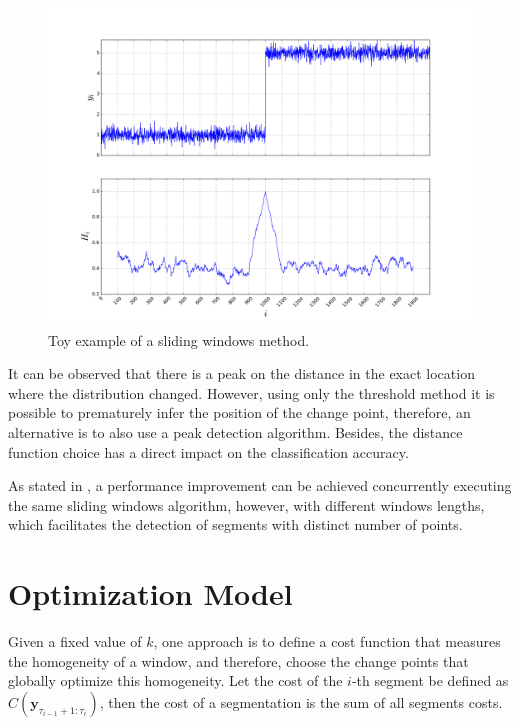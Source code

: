 \begin{figure}[H]
    \centering
    \includegraphics[width=1.0\textwidth]{./figures/sliding_window_toy_example.png}
    \caption{Toy example of a sliding windows method.}
    \label{fig:sliding_window_toy_example}
\end{figure}

It can be observed that there is a peak on the distance in the exact location where the distribution changed. However, using only the threshold method it is possible to prematurely infer the position of the change point, therefore, an alternative is to also use a peak detection algorithm. Besides, the distance function choice has a direct impact on the classification accuracy.

As stated in \cite{detecting_change_in_data_streams}, a performance improvement can be achieved concurrently executing the same sliding windows algorithm, however, with different windows lengths, which facilitates the detection of segments with distinct number of points.

\section{Optimization Model}  

Given a fixed value of $k$, one approach is to define a cost function that measures the homogeneity of a window, and therefore, choose the change points that globally optimize this homogeneity. Let the cost of the $i$-th segment be defined as $C(\mathbf{y}_{\tau_{i - 1} + 1 : \tau_{i}})$, then the cost of a segmentation is the sum of all segments costs.

